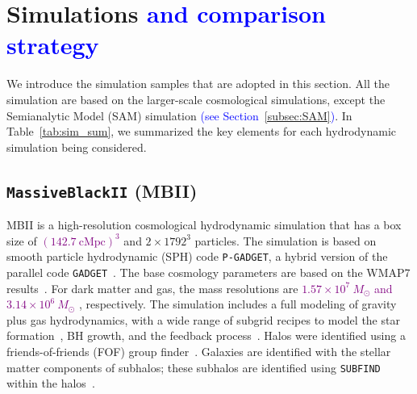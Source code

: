 \documentclass[twocolumn]{aastex631}
\newcommand{\todo}[1]{\textcolor{red}{[{\bf TODO}: #1]}}
\newcommand{\blue}[1]{\textcolor{blue}{#1}}
\newcommand{\yo}[1]{\textcolor{purple}{[{\bf Yohan}: #1]}}
\newcommand{\red}[1]{\textcolor{purple}{#1}}
\begin{document}
\section{Simulations \blue{and comparison strategy}}
\label{sec:simulations}
We introduce the simulation samples that are adopted in this section. All the simulation are based on the larger-scale cosmological simulations, except the Semianalytic Model (SAM) simulation \blue{(see Section~\ref{subsec:SAM})}. In Table~\ref{tab:sim_sum}, we summarized the key elements for each hydrodynamic simulation being considered.

\subsection{{\tt MassiveBlackII} (MBII)}\label{subsec:MBII}
MBII is a high-resolution cosmological hydrodynamic simulation that has a box size of %
\red{$(142.7~\mathrm{cMpc})^3$}
and $2\times1792^3$ particles. The simulation is based on smooth particle hydrodynamic (SPH) code \texttt{P-GADGET}, a hybrid version of the parallel code {\tt GADGET}~\citep{2005MNRAS.364.1105S}. 
The base cosmology parameters are based on the WMAP7 results~\citep{2011ApJS..192...18K}.
For dark matter and gas, the mass resolutions are %
\red{$1.57\times 10^7~M_{\odot}$ and $3.14\times 10^6~M_{\odot}$}
, respectively. The simulation includes a full modeling of gravity plus gas hydrodynamics, with a wide range of subgrid recipes to model the star formation~\citep{2003MNRAS.339..289S}, BH growth, and the feedback process~\citep{2005Natur.433..604D}. Halos were identified using a friends-of-friends (FOF) group finder~\citep{1985ApJ...292..371D}. Galaxies are identified with the stellar matter components of subhalos; these subhalos are identified using {\tt SUBFIND} within the halos~\citep{2005MNRAS.364.1105S}.
\end{document}
